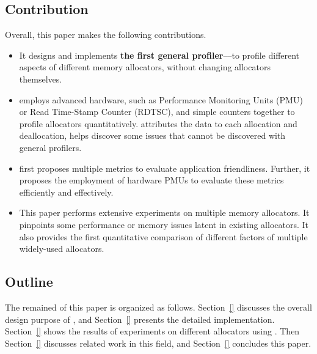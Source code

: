  

\subsection*{Contribution}

Overall, this paper makes the following contributions. 

\begin{itemize}
\item It designs and implements \textbf{the first general profiler}--\MP{}--to profile different aspects of different memory allocators, without changing allocators themselves.  

\item \MP{} employs advanced hardware, such as Performance Monitoring Units (PMU) or Read Time-Stamp Counter (RDTSC), and simple counters together to profile allocators quantitatively. \MP{} attributes the data to each allocation and deallocation, helps discover some issues that cannot be discovered with general profilers.  

\item \MP{} first proposes multiple metrics to evaluate application friendliness. Further, it proposes the employment of hardware PMUs to evaluate these metrics efficiently and effectively. 

\item This paper performs extensive experiments on multiple memory allocators. It pinpoints some performance or memory issues latent in existing allocators. It also provides the first quantitative comparison of different factors of multiple widely-used allocators.  

\end{itemize} 

\subsection*{Outline}

The remained of this paper is organized as follows. Section~\ref{} discusses the overall design purpose of \MP{}, and Section~\ref{} presents the detailed implementation. Section~\ref{} shows the results of experiments on different allocators using \MP{}. Then Section~\ref{} discusses related work in this field, and Section~\ref{} concludes this paper. 
